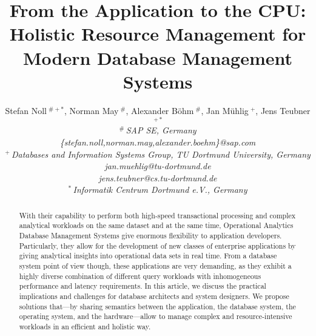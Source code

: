 \documentclass[11pt]{article}
\begin{document}
\title{From the Application to the CPU: Holistic Resource Management for Modern Database Management Systems}
\author{%
{Stefan Noll{\small$~^{\#+*}$}, Norman May{\small$~^{\#}$}, Alexander B\"{o}hm{\small$~^{\#}$}, Jan M\"{u}hlig$~^{+}$, Jens Teubner{\small$~^{+*}$} }
\vspace{1.2mm}\\
\fontsize{10}{10}\selectfont\rmfamily\itshape
$^{\#}$\,SAP SE, Germany\\
\fontsize{9}{9}\selectfont\ttfamily\upshape
\{stefan.noll,norman.may,alexander.boehm\}@sap.com
\vspace{1.6mm}\\
\fontsize{10}{10}\selectfont\itshape
$^{+}$\,Databases and Information Systems Group, TU Dortmund University, Germany\\
\fontsize{9}{9}\selectfont\ttfamily\upshape
jan.muehlig@tu-dortmund.de\\
\fontsize{9}{9}\selectfont\ttfamily\upshape
jens.teubner@cs.tu-dortmund.de
\vspace{1.6mm}\\
\fontsize{10}{10}\selectfont\itshape
$^{*}$\,Informatik Centrum Dortmund e.V., Germany
}
\maketitle

\begin{abstract}
With their capability to perform both high-speed transactional processing and complex analytical workloads on the same dataset and at the same time, Operational Analytics Database Management Systems give enormous flexibility to application developers.
Particularly, they allow for the development of new classes of enterprise applications by giving analytical insights into operational data sets in real time.
From a database system point of view though, these applications are very demanding, as they exhibit a highly diverse combination of  different query workloads with inhomogeneous performance and latency requirements.
In this article, we discuss the practical implications and challenges for database architects and system designers. We propose solutions that---by sharing semantics between the application, the database system, the operating system, and the hardware---allow to manage complex and resource-intensive workloads in an efficient and holistic way.
\end{abstract}
\end{document}
